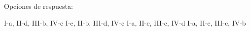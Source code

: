 \documentclass[12pt, letter]{exam}
\begin{document}
\begin{questions}
\begin{multicols}{2}
    \end{multicols}

    Opciones de respuesta:
    \begin{multicols}{2}
    \begin{tasks}
        \task I-a, II-d, III-b, IV-e
        \task I-e, II-b, III-d, IV-c
        \task I-a, II-e, III-c, IV-d
        \task I-a, II-e, III-c, IV-b
    \end{tasks}
    \end{multicols}

\end{questions}

\newpage
\end{document}
